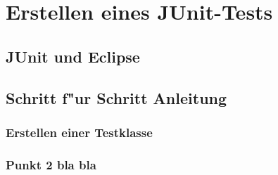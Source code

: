 %
%
\chapter{Erstellen eines JUnit-Tests}\label{ch:testerstellen}
	\section{JUnit und Eclipse}\label{s:junitundeclipse}
	\section{Schritt f"ur Schritt Anleitung}\label{s:anleitung}
		\subsection*{Erstellen einer Testklasse}\label{s:testklasseerstellen}
		\subsection*{Punkt 2 bla bla}\label{s:label}